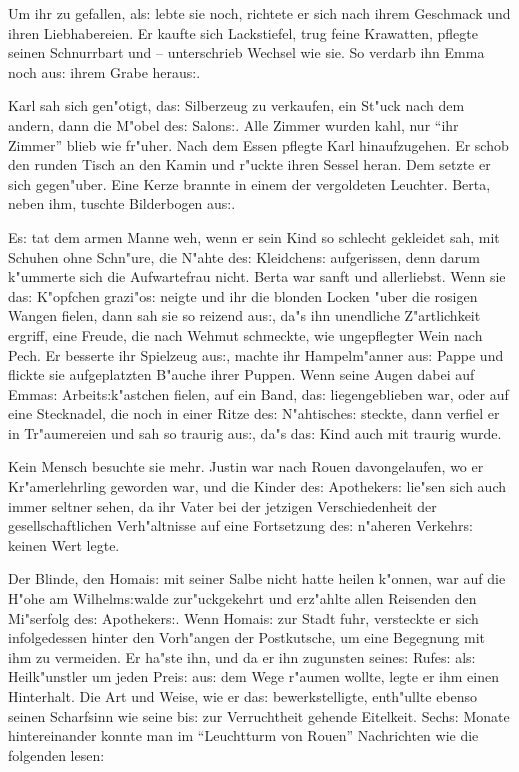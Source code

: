 \documentclass[oneside,12pt]{book}
\newcommand{\s}{s:}%
\begin{document}
Um ihr zu gefallen, al{\s} lebte sie noch, richtete er sich nach
ihrem Geschmack und ihren Liebhabereien. Er kaufte sich
Lackstiefel, trug feine Krawatten, pflegte seinen Schnurrbart und
-- unterschrieb Wechsel wie sie. So verdarb ihn Emma noch au{\s}
ihrem Grabe herau{\s}.

Karl sah sich gen"otigt, da{\s} Silberzeug zu verkaufen, ein
St"uck nach dem andern, dann die M"obel de{\s} Salon{\s}. Alle
Zimmer wurden kahl, nur "`ihr Zimmer"' blieb wie fr"uher. Nach dem
Essen pflegte Karl hinaufzugehen. Er schob den runden Tisch an den
Kamin und r"uckte ihren Sessel heran. Dem setzte er sich
gegen"uber. Eine Kerze brannte in einem der vergoldeten Leuchter.
Berta, neben ihm, tuschte Bilderbogen au{\s}.

E{\s} tat dem armen Manne weh, wenn er sein Kind so schlecht
gekleidet sah, mit Schuhen ohne Schn"ure, die N"ahte de{\s}
Kleidchen{\s} aufgerissen, denn darum k"ummerte sich die
Aufwartefrau nicht. Berta war sanft und allerliebst. Wenn sie
da{\s} K"opfchen grazi"o{\s} neigte und ihr die blonden Locken
"uber die rosigen Wangen fielen, dann sah sie so reizend au{\s},
da"s ihn unendliche Z"artlichkeit ergriff, eine Freude, die nach
Wehmut schmeckte, wie ungepflegter Wein nach Pech. Er besserte ihr
Spielzeug au{\s}, machte ihr Hampelm"anner au{\s} Pappe und
flickte sie aufgeplatzten B"auche ihrer Puppen. Wenn seine Augen
dabei auf Emma{\s} Arbeit{\s}k"astchen fielen, auf ein Band,
da{\s} liegengeblieben war, oder auf eine Stecknadel, die noch in
einer Ritze de{\s} N"ahtische{\s} steckte, dann verfiel er in
Tr"aumereien und sah so traurig au{\s}, da"s da{\s} Kind auch mit
traurig wurde.

Kein Mensch besuchte sie mehr. Justin war nach Rouen davongelaufen,
wo er Kr"amerlehrling geworden war, und die Kinder de{\s}
Apotheker{\s} lie"sen sich auch immer seltner sehen, da ihr Vater
bei der jetzigen Verschiedenheit der gesellschaftlichen
Verh"altnisse auf eine Fortsetzung de{\s} n"aheren Verkehr{\s}
keinen Wert legte.

Der Blinde, den Homai{\s} mit seiner Salbe nicht hatte heilen
k"onnen, war auf die H"ohe am Wilhelm{\s}walde zur"uckgekehrt und
erz"ahlte allen Reisenden den Mi"serfolg de{\s} Apotheker{\s}.
Wenn Homai{\s} zur Stadt fuhr, versteckte er sich infolgedessen
hinter den Vorh"angen der Postkutsche, um eine Begegnung mit ihm
zu vermeiden. Er ha"ste ihn, und da er ihn zugunsten seine{\s}
Rufe{\s} al{\s} Heilk"unstler um jeden Prei{\s} au{\s} dem Wege
r"aumen wollte, legte er ihm einen Hinterhalt. Die Art und Weise,
wie er da{\s} bewerkstelligte, enth"ullte ebenso seinen Scharfsinn
wie seine bi{\s} zur Verruchtheit gehende Eitelkeit. Sech{\s}
Monate hintereinander konnte man im "`Leuchtturm von Rouen"'
Nachrichten wie die folgenden lesen:
\end{document}
